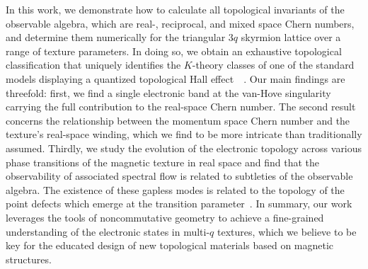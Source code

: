 \documentclass[submission, Phys]{SciPost}
\begin{document}
In this work, we demonstrate how to calculate all topological invariants of the observable algebra, which are real-, reciprocal, and mixed space Chern numbers, and determine them numerically for the triangular $3q$ skyrmion lattice over a range of texture parameters.
In doing so, we obtain an exhaustive topological classification that uniquely identifies the $K$-theory classes of one of the standard models displaying a quantized topological Hall effect~\cite{Hamamoto2015}~\cite{Gobel2017, Gobel2017b}.
Our main findings are threefold: first, we find a single electronic band at the van-Hove singularity carrying the full contribution to the real-space Chern number. 
The second result concerns the relationship between the momentum space Chern number and the texture's real-space winding, which we find to be more intricate than traditionally assumed.
Thirdly, we study the evolution of the electronic topology across various phase transitions of the magnetic texture in real space and find that the observability of associated spectral flow is related to subtleties of the observable algebra.
The existence of these gapless modes is related to the topology of the point defects which emerge at the transition parameter~\cite{Teo2010}.
In summary, our work leverages the tools of noncommutative geometry to achieve a fine-grained understanding of the electronic states in multi-$q$ textures, which we believe to be key for the educated design of new topological materials based on magnetic structures.
\end{document}
